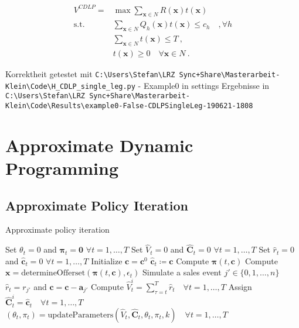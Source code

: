 \begin{align}
	V^{CDLP} = & \max \sum_{\boldsymbol{x}\in N} R(\boldsymbol{x}) t(\boldsymbol{x})\\
	\text{s.t. } & \sum_{\boldsymbol{x}\in N} Q_h(\boldsymbol{x}) t(\boldsymbol{x}) \leq c_h \quad, \forall h\\
	& \sum_{\boldsymbol{x}\in N} t(\boldsymbol{x}) \leq T~,\\
	& t(\boldsymbol{x}) \geq 0 \quad \forall \boldsymbol{x} \in N~.
\end{align}

Korrektheit getestet mit \texttt{C:\textbackslash{}Users\textbackslash{}Stefan\textbackslash{}LRZ Sync+Share\textbackslash{}Masterarbeit-Klein\textbackslash{}Code\textbackslash{}H\_CDLP\_single\_leg.py} - Example0 in settings
Ergebnisse in \texttt{ C:\textbackslash{}Users\textbackslash{}Stefan\textbackslash{}LRZ Sync+Share\textbackslash{}Masterarbeit-Klein\textbackslash{}Code\textbackslash{}Results\textbackslash{}example0-False-CDLPSingleLeg-190621-1808}

\section{Approximate Dynamic Programming}

\subsection{Approximate Policy Iteration}

\begin{algorithm}
	\caption{Approximate policy iteration}\label{alg-API}
	\begin{algorithmic}[1]
		\State Set $\theta_t = 0$ and $\mathbf{\pi}_t = \mathbf{0}$ $\forall t = 1, \dots, T$
		\State Set $\hat{V}_t = 0$ and $\mathbf{\hat{C}}_t = 0$ $\forall t = 1, \dots, T$
		\State Set $\hat{r}_t = 0$ and $\mathbf{\hat{c}}_t = 0$ $\forall t = 1, \dots, T$
		\State Initialize $\mathbf{c} = \mathbf{c}^0$
		\State $\mathbf{\hat{c}}_t \coloneqq \mathbf{c}$
		\State Compute $\mathbf{\pi}(t, \mathbf{c})$ \label{alg-API-calcPi}
		\State Compute $\mathbf{x} = \text{determineOfferset}(\mathbf{\pi}(t, \mathbf{c}), \epsilon_t)$
		\State Simulate a sales event $j' \in \{0, 1, \dots, n\}$
		\State $\hat{r}_t = r_{j'}$ and $\mathbf{c} = \mathbf{c} - \mathbf{a}_{j'}$
		\EndIf
		\EndFor
		\State Compute $\hat{V}_t^i = \sum_{\tau = t}^{T}\hat{r}_t \quad \forall t = 1, \dots, T$
		\State Assign $\mathbf{\hat{C}}_t^i = \mathbf{\hat{c}}_t \quad \forall t = 1, \dots, T$
		\EndFor
		\State $\left(\theta_t, \pi_t \right) = \text{updateParameters}\left(\hat{V}_t, \mathbf{\hat{C}}_t, \theta_t, \pi_t, k\right) \quad \forall t = 1, \dots, T$ \label{alg-API-updateParam}
		\EndFor
	\end{algorithmic}
\end{algorithm}

